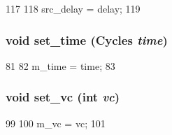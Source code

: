 \begin{DoxyCode}
117 {
118     src_delay = delay;
119 }
\end{DoxyCode}
\hypertarget{classflit_ae1056dab3fa41e4faf25e82848d0a6a5}{
\subsubsection[{set\_\-time}]{\setlength{\rightskip}{0pt plus 5cm}void set\_\-time ({\bf Cycles} {\em time})}}
\label{classflit_ae1056dab3fa41e4faf25e82848d0a6a5}



\begin{DoxyCode}
81 {
82     m_time = time;
83 }
\end{DoxyCode}
\hypertarget{classflit_a4ce1a22dd3bca1c2111888b02d8f6baa}{
\subsubsection[{set\_\-vc}]{\setlength{\rightskip}{0pt plus 5cm}void set\_\-vc (int {\em vc})}}
\label{classflit_a4ce1a22dd3bca1c2111888b02d8f6baa}



\begin{DoxyCode}
99 {
100     m_vc = vc;
101 }
\end{DoxyCode}


